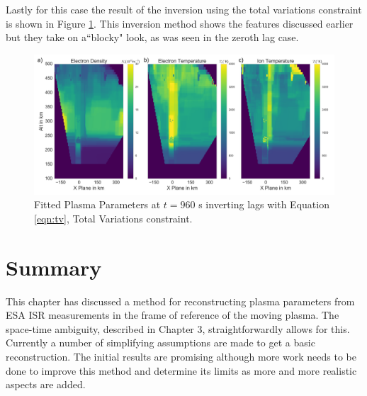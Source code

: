 Lastly for this case the result of the inversion using the total variations constraint is shown in Figure \ref{fig:tv}. This inversion method shows the features discussed earlier but they take on a``blocky" look, as was seen in the zeroth lag case. 
\begin{figure}[!ht]
\centering
\includegraphics[width=6in]{tvfitted}
\caption{Fitted Plasma Parameters at $t=960$ s inverting lags with Equation \ref{eqn:tv}, Total Variations constraint.}
\label{fig:tv}
\end{figure}

\section{Summary}

This chapter has discussed a method for reconstructing plasma parameters from ESA ISR measurements in the frame of reference of the moving plasma. The space-time ambiguity, described in Chapter 3, straightforwardly allows for this. Currently a number of simplifying assumptions are made to get a basic reconstruction. The initial results are promising although more work needs to be done to improve this method and determine its limits as more and more realistic aspects are added.